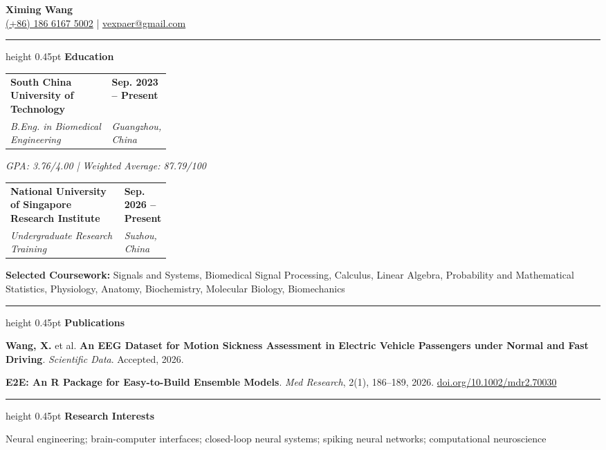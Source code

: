 \documentclass[11pt,a4paper]{article}
\makeatletter
\newcommand{\eduentry}[4]{%
  \begin{tabularx}{\linewidth}{@{}X>{\raggedleft\arraybackslash}p{0.27\linewidth}@{}}
    \textbf{#1} & \textbf{#2} \\
    \textit{#3} & \textit{#4}
  \end{tabularx}
}
\newcommand{\cvsection}[1]{%
  \vspace{12pt}
  \hrule height 0.45pt
  \vspace{12pt}
  {\large\bfseries #1}\par
  \vspace{6pt}
}
\makeatother
\begin{document}
\begin{center}
  {\LARGE\bfseries Ximing Wang}\\[3pt]
  \href{tel:+8618661675002}{(+86) 186 6167 5002}
  \;|\;
  \href{mailto:vexpaer@gmail.com}{vexpaer@gmail.com}
\end{center}

\vspace{-2pt}

\cvsection{Education}

\eduentry
{South China University of Technology}
{Sep. 2023 -- Present}
{B.Eng. in Biomedical Engineering}
{Guangzhou, China}

\textit{GPA: 3.76/4.00 \;|\; Weighted Average: 87.79/100}\par

\vspace{4pt}
\eduentry
{National University of Singapore Research Institute}
{Sep. 2026 -- Present}
{Undergraduate Research Training}
{Suzhou, China}

\vspace{4pt}
\textbf{Selected Coursework:}
Signals and Systems, Biomedical Signal Processing, Calculus,
Linear Algebra, Probability and Mathematical Statistics, Physiology,
Anatomy, Biochemistry, Molecular Biology, Biomechanics

\cvsection{Publications}

\textbf{Wang, X.} et al.
\textbf{An EEG Dataset for Motion Sickness Assessment in Electric Vehicle
Passengers under Normal and Fast Driving}.
\textit{Scientific Data}. Accepted, 2026.

\vspace{6pt}
\textbf{E2E: An R Package for Easy-to-Build Ensemble Models}.
\textit{Med Research}, 2(1), 186--189, 2026.
\href{https://doi.org/10.1002/mdr2.70030}{doi.org/10.1002/mdr2.70030}

\cvsection{Research Interests}

Neural engineering;
brain-computer interfaces;
closed-loop neural systems;
spiking neural networks;
computational neuroscience
\end{document}
